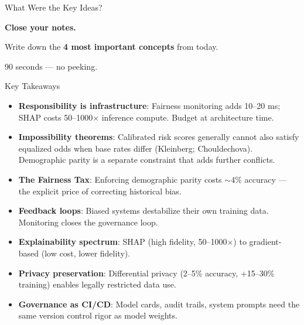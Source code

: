 \documentclass[aspectratio=169, 12pt]{beamer}
\begin{document}
\begin{frame}{What Were the Key Ideas?}

\centering
\vspace{1.5cm}
{\Large\bfseries Close your notes.}

\vspace{0.8cm}
{\large Write down the \textbf{4 most important concepts} from today.}

\vspace{0.8cm}
{\normalsize\textcolor{midgray}{90 seconds --- no peeking.}}

\end{frame}

\begin{frame}{Key Takeaways}

\scriptsize
\begin{itemize}\setlength\itemsep{0pt}
  \item \textbf{Responsibility is infrastructure}: Fairness monitoring adds 10--20 ms; SHAP costs 50--1000$\times$ inference compute. Budget at architecture time.
  \item \textbf{Impossibility theorems}: Calibrated risk scores generally cannot also satisfy equalized odds when base rates differ (Kleinberg; Chouldechova). Demographic parity is a separate constraint that adds further conflicts.
  \item \textbf{The Fairness Tax}: Enforcing demographic parity costs $\sim$4\% accuracy --- the explicit price of correcting historical bias.
  \item \textbf{Feedback loops}: Biased systems destabilize their own training data. Monitoring closes the governance loop.
  \item \textbf{Explainability spectrum}: SHAP (high fidelity, 50--1000$\times$) to gradient-based (low cost, lower fidelity).
  \item \textbf{Privacy preservation}: Differential privacy (2--5\% accuracy, +15--30\% training) enables legally restricted data use.
  \item \textbf{Governance as CI/CD}: Model cards, audit trails, system prompts need the same version control rigor as model weights.
\end{itemize}

\end{frame}
\end{document}
